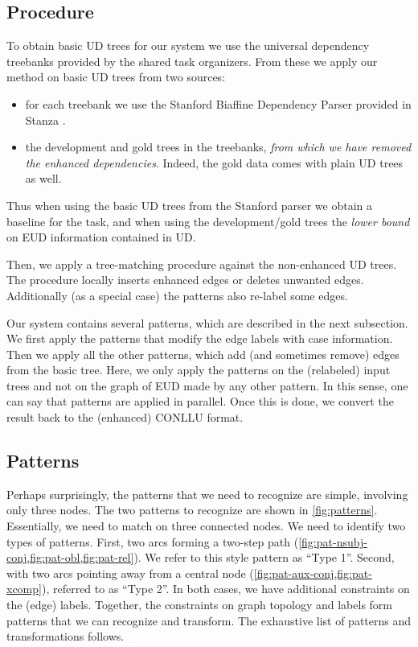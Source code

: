 \documentclass[11pt,a4paper]{article}
\begin{document}
\subsection{Procedure} 
To obtain basic UD trees for our system we use the universal
dependency treebanks provided by the shared task organizers. From
these we apply our method on basic UD trees from two sources:

\begin{itemize}
\item for each treebank we use the Stanford Biaffine Dependency
      Parser \citep{dozat2016deep} provided in Stanza
\citep{qi2020stanza}.
\item the development and gold trees in the treebanks, \emph{from
      which we have removed the enhanced dependencies}. Indeed, the gold
      data comes with plain UD trees as well.
\end{itemize}

Thus when using the basic UD trees from the Stanford parser we obtain a
baseline for the task, and when using the development/gold trees the
\emph{lower bound} on EUD information contained in UD.

%
Then, we apply a tree-matching procedure against the non-enhanced UD
trees. The procedure locally inserts enhanced edges or deletes unwanted
edges. Additionally (as a special case) the patterns also re-label some edges.

Our system contains several patterns, which are described in the next
subsection. We first apply the patterns that modify
the edge labels with case information. Then we apply all the other
patterns, which add (and sometimes remove) edges from the basic
tree. Here, we only apply the patterns on the (relabeled) input trees
and not on the graph of EUD made by any other pattern. In this sense,
one can say that patterns are applied in parallel.
%
Once this is done, we convert the result back to the
(enhanced) CONLLU format.

\subsection{Patterns}

Perhaps surprisingly, the patterns that we need to recognize are
simple, involving only three nodes. The two patterns to recognize
are shown in \cref{fig:patterns}. Essentially, we need to match
on three connected nodes.  We need to identify two types of
patterns. First, two arcs forming a two-step path
(\cref{fig:pat-nsubj-conj,fig:pat-obl,fig:pat-rel}). We refer to
this style pattern as ``Type 1''.  Second, with two arcs pointing
away from a central node (\cref{fig:pat-aux-conj,fig:pat-xcomp}),
referred to as ``Type 2''.  In both cases, we have additional
constraints on the (edge) labels. Together, the constraints on
graph topology and labels form patterns that we can recognize
and transform.  The exhaustive list of patterns and
transformations follows.
\end{document}
